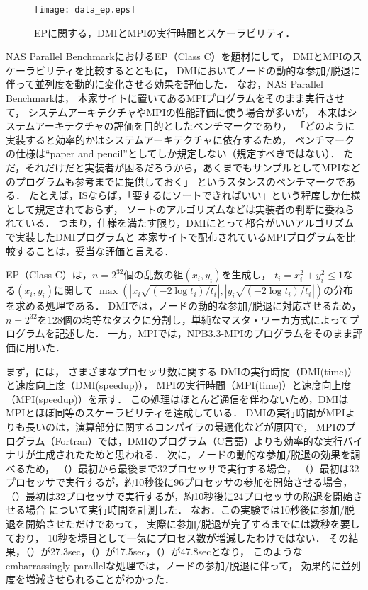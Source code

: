 \documentclass[10pt]{jsarticle}
\begin{document}
\begin{figure}
  \centering
  \texttt{[image: data\_ep.eps]}
  \caption{EPに関する，DMIとMPIの実行時間とスケーラビリティ．}
  \label{fig:data_ep}
\end{figure}

NAS Parallel BenchmarkにおけるEP（Class C）を題材にして，
DMIとMPIのスケーラビリティを比較するとともに，
DMIにおいてノードの動的な参加/脱退に伴って並列度を動的に変化させる効果を評価した．
なお，NAS Parallel Benchmarkは，
本家サイトに置いてあるMPIプログラムをそのまま実行させて，
システムアーキテクチャやMPIの性能評価に使う場合が多いが，
本来はシステムアーキテクチャの評価を目的としたベンチマークであり，
「どのように実装すると効率的かはシステムアーキテクチャに依存するため，
ベンチマークの仕様は``paper and pencil''としてしか規定しない（規定すべきではない）．
ただ，それだけだと実装者が困るだろうから，あくまでもサンプルとしてMPIなどのプログラムも参考までに提供しておく」
というスタンスのベンチマークである．
たとえば，ISならば，「要するにソートできればいい」という程度しか仕様として規定されておらず，
ソートのアルゴリズムなどは実装者の判断に委ねられている．
つまり，仕様を満たす限り，DMIにとって都合がいいアルゴリズムで実装したDMIプログラムと
本家サイトで配布されているMPIプログラムを比較することは，妥当な評価と言える．

EP（Class C）は，$n=2^{32}$個の乱数の組$(x_i,y_i)$を生成し，
$t_i=x_i^2+y_i^2\le1$なる$(x_i,y_i)$に関して
$\max(|x_i\sqrt{(-2\log t_i)/t_i}|,|y_i\sqrt{(-2\log t_i)/t_i}|)$の分布を求める処理である．
DMIでは，ノードの動的な参加/脱退に対応させるため，
$n=2^{32}$を128個の均等なタスクに分割し，単純なマスタ・ワーカ方式によってプログラムを記述した．
一方，MPIでは，NPB3.3-MPIのプログラムをそのまま評価に用いた．

まず，には，
さまざまなプロセッサ数に関する
DMIの実行時間（DMI(time)）と速度向上度（DMI(speedup)），
MPIの実行時間（MPI(time)）と速度向上度（MPI(speedup)）を示す．
この処理はほとんど通信を伴わないため，DMIはMPIとほぼ同等のスケーラビリティを達成している．
DMIの実行時間がMPIよりも長いのは，演算部分に関するコンパイラの最適化などが原因で，
MPIのプログラム（Fortran）では，DMIのプログラム（C言語）よりも効率的な実行バイナリが生成されたためと思われる．
次に，ノードの動的な参加/脱退の効果を調べるため，
（\I）最初から最後まで32プロセッサで実行する場合，
（\II）最初は32プロセッサで実行するが，約10秒後に96プロセッサの参加を開始させる場合，
（\III）最初は32プロセッサで実行するが，約10秒後に24プロセッサの脱退を開始させる場合
について実行時間を計測した．
なお．この実験では10秒後に参加/脱退を開始させただけであって，
実際に参加/脱退が完了するまでには数秒を要しており，
10秒を境目として一気にプロセス数が増減したわけではない．
その結果，（\I）が27.3sec，（\II）が17.5sec，（\III）が47.8secとなり，
このようなembarrassingly parallelな処理では，ノードの参加/脱退に伴って，
効果的に並列度を増減させられることがわかった．
\end{document}
